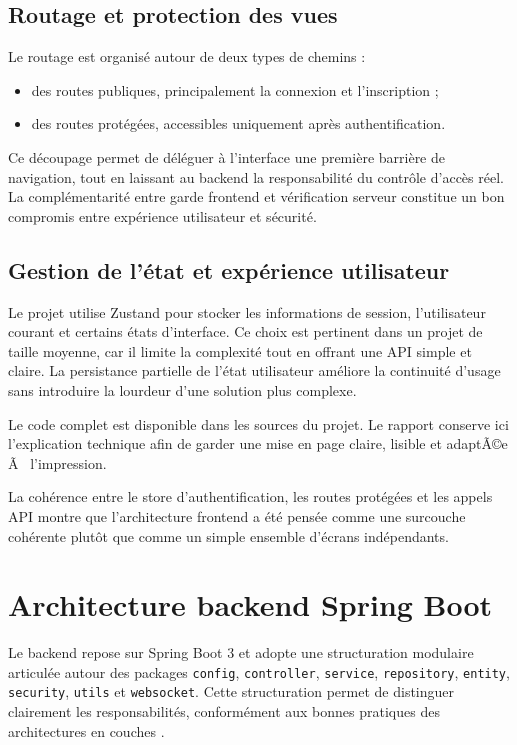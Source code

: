 ﻿\documentclass[12pt,a4paper,oneside]{report}
\newenvironment{codeblock}[1][]{
  \par
  \captionsetup{type=figure}
}{
  \par
}
\begin{document}
\subsection{Routage et protection des vues}
Le routage est organisé autour de deux types de chemins :
\begin{itemize}
  \item des routes publiques, principalement la connexion et l'inscription ;
  \item des routes protégées, accessibles uniquement après authentification.
\end{itemize}

Ce découpage permet de déléguer à l'interface une première barrière de navigation, tout en laissant au backend la responsabilité du contrôle d'accès réel. La complémentarité entre garde frontend et vérification serveur constitue un bon compromis entre expérience utilisateur et sécurité.

\subsection{Gestion de l'état et expérience utilisateur}
Le projet utilise Zustand pour stocker les informations de session, l'utilisateur courant et certains états d'interface. Ce choix est pertinent dans un projet de taille moyenne, car il limite la complexité tout en offrant une API simple et claire. La persistance partielle de l'état utilisateur améliore la continuité d'usage sans introduire la lourdeur d'une solution plus complexe.

\begin{codeblock}[H]
\caption{Gestion centralisée de l'authentification côté frontend}
\begin{keybox}
Le code complet est disponible dans les sources du projet. Le rapport conserve ici l'explication technique afin de garder une mise en page claire, lisible et adaptÃ©e Ã  l'impression.
\end{keybox}
\end{codeblock}

La cohérence entre le store d'authentification, les routes protégées et les appels API montre que l'architecture frontend a été pensée comme une surcouche cohérente plutôt que comme un simple ensemble d'écrans indépendants.

\section{Architecture backend Spring Boot}
Le backend repose sur Spring Boot 3 et adopte une structuration modulaire articulée autour des packages \texttt{config}, \texttt{controller}, \texttt{service}, \texttt{repository}, \texttt{entity}, \texttt{security}, \texttt{utils} et \texttt{websocket}. Cette structuration permet de distinguer clairement les responsabilités, conformément aux bonnes pratiques des architectures en couches \cite{fowler2002,springdocs}.
\end{document}
